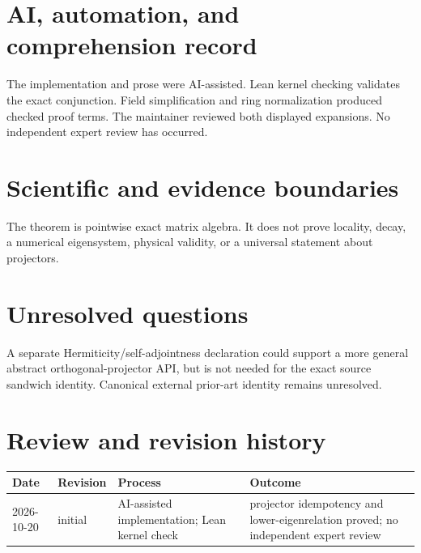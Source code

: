 \documentclass[11pt]{article}
\begin{document}
\section{AI, automation, and comprehension record}
The implementation and prose were AI-assisted. Lean kernel checking validates the exact
conjunction. Field simplification and ring normalization produced checked proof terms.
The maintainer reviewed both displayed expansions. No independent expert review has
occurred.

\section{Scientific and evidence boundaries}
The theorem is pointwise exact matrix algebra. It does not prove locality, decay, a
numerical eigensystem, physical validity, or a universal statement about projectors.

\section{Unresolved questions}
A separate Hermiticity/self-adjointness declaration could support a more general abstract
orthogonal-projector API, but is not needed for the exact source sandwich identity.
Canonical external prior-art identity remains unresolved.

\section{Review and revision history}
\begin{tabularx}{\textwidth}{@{}lllX@{}}\toprule
Date & Revision & Process & Outcome \\
\midrule
2026-10-20 & initial & AI-assisted implementation; Lean kernel check & projector idempotency and lower-eigenrelation proved; no independent expert review \\
\bottomrule\end{tabularx}
\end{document}
